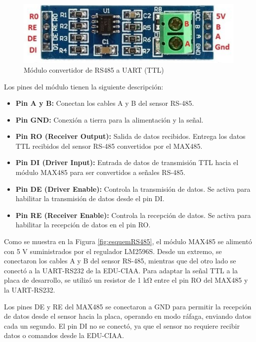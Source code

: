 \begin{figure}[H]
    \centering
    \includegraphics[width=0.55\linewidth]{Figuras/datalogger/Hardware/moduleMax485.png}
    \caption{Módulo convertidor de RS485 a UART (TTL)}
    \label{fig:moduleMax485}
\end{figure}
Los pines del módulo tienen la siguiente descripción:

\begin{itemize}
    \item \textbf{Pin A y B:} Conectan los cables A y B del sensor RS-485.
    \item \textbf{Pin GND:} Conexión a tierra para la alimentación y la señal.
    \item \textbf{Pin RO (Receiver Output):} Salida de datos recibidos. Entrega los datos TTL recibidos del sensor RS-485 convertidos por el MAX485.
    \item \textbf{Pin DI (Driver Input):} Entrada de datos de transmisión TTL hacia el módulo MAX485 para ser convertidos a señales RS-485.
    \item \textbf{Pin DE (Driver Enable):} Controla la transmisión de datos. Se activa para habilitar la transmisión de datos desde el pin DI.
    \item \textbf{Pin RE (Receiver Enable):} Controla la recepción de datos. Se activa para habilitar la recepción de datos en el pin RO.
\end{itemize}

Como se muestra en la Figura \ref{fig:esquemRS485}, el módulo MAX485 se alimentó con 5 \unit{\volt} suministrados por el regulador LM2596S. Desde un extremo, se conectaron los cables A y B del sensor RS-485, mientras que del otro lado se conectó a la UART-RS232 de la EDU-CIAA. Para adaptar la señal TTL a la placa de desarrollo, se utilizó un resistor de 1 \unit{\kilo\ohm} entre el pin RO del MAX485 y la UART-RS232.

Los pines DE y RE del MAX485 se conectaron a GND para permitir la recepción de datos desde el sensor hacia la placa, operando en modo ráfaga, enviando datos cada un segundo. El pin DI no se conectó, ya que el sensor no requiere recibir datos o comandos desde la EDU-CIAA.

